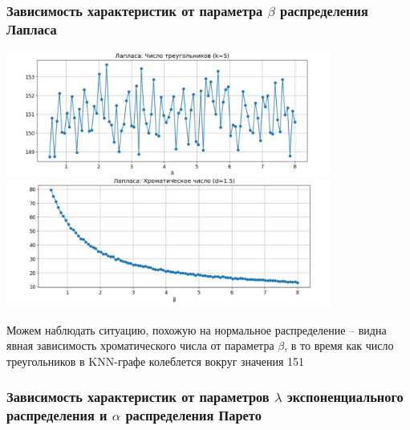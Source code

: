 \documentclass[a4paper,12pt]{article}
\begin{document}
\subsubsection{Зависимость характеристик от параметра $\beta$ распределения Лапласа}

\begin{center}
    \includegraphics[width=0.8\textwidth]{images/number_triangles_laplace.png}
    \includegraphics[width=0.8\textwidth]{images/chromatric_number_laplace.png}
\end{center}

Можем наблюдать ситуацию, похожую на нормальное распределение -- видна явная зависимость хроматического числа от параметра $\beta$, в то время как число треугольников в KNN-графе колеблется вокруг значения 151



\subsubsection{Зависимость характеристик от параметров $\lambda$ экспоненциального распределения и $\alpha$ распределения Парето}
\end{document}
